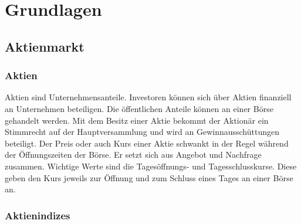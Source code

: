 \section{Grundlagen}

\subsection{Aktienmarkt}

\subsubsection{Aktien}


Aktien sind Unternehmensanteile. Investoren können sich über Aktien finanziell an Unternehmen beteiligen. Die öffentlichen Anteile können an einer Börse gehandelt werden. Mit dem Besitz einer Aktie bekommt der Aktionär ein Stimmrecht auf der Hauptversammlung und wird an Gewinnausschüttungen beteiligt. Der Preis oder auch Kurs einer Aktie schwankt in der Regel während der Öffnungszeiten der Börse. Er setzt sich aus Angebot und Nachfrage zusammen. Wichtige Werte sind die Tagesöffnungs- und Tagesschlusskurse. Diese geben den Kurs jeweils zur Öffnung und zum Schluss eines Tages an einer Börse an.


\subsubsection{Aktienindizes}

